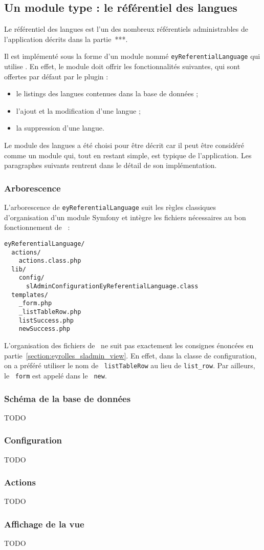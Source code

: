 \subsection{Un module type : le référentiel des langues}
\label{section:eyrolles_ref-langues}

Le référentiel des langues est l'un des nombreux référentiels administrables de l'application décrits dans la partie~***.

Il est implémenté sous la forme d'un module nommé \texttt{eyReferentialLanguage} qui utilise \asladmin. En effet, le module doit offrir les fonctionnalités suivantes, qui sont offertes par défaut par le plugin :
\begin{itemize}
\item le listings des langues contenues dans la base de données ;
\item l'ajout et la modification d'une langue ;
\item la suppression d'une langue.
\end{itemize}

Le module des langues a été choisi pour être décrit car il peut être considéré comme un module qui, tout en restant simple, est typique de l'application. Les paragraphes suivants rentrent dans le détail de son implémentation.


\subsubsection{Arborescence}

L'arborescence de \texttt{eyReferentialLanguage} suit les règles classiques d'organisation d'un module Symfony et intègre les fichiers nécessaires au bon fonctionnement de \asladmin\ :

\begin{verbatim}
eyReferentialLanguage/
  actions/
    actions.class.php
  lib/
    config/
      slAdminConfigurationEyReferentialLanguage.class
  templates/
    _form.php
    _listTableRow.php
    listSuccess.php
    newSuccess.php
\end{verbatim}

L'organisation des fichiers de \atemplate\ ne suit pas exactement les consignes énoncées en partie~\ref{section:eyrolles_sladmin_view}. En effet, dans la classe de configuration, on a préféré utiliser le nom de \apartial\ \texttt{listTableRow} au lieu de \texttt{list\_row}. Par ailleurs, le \apartial\ \texttt{form} est appelé dans le \atemplate\ \texttt{new}.


\subsubsection{Schéma de la base de données}

TODO


\subsubsection{Configuration}

TODO


\subsubsection{Actions}

TODO


\subsubsection{Affichage de la vue}

TODO
